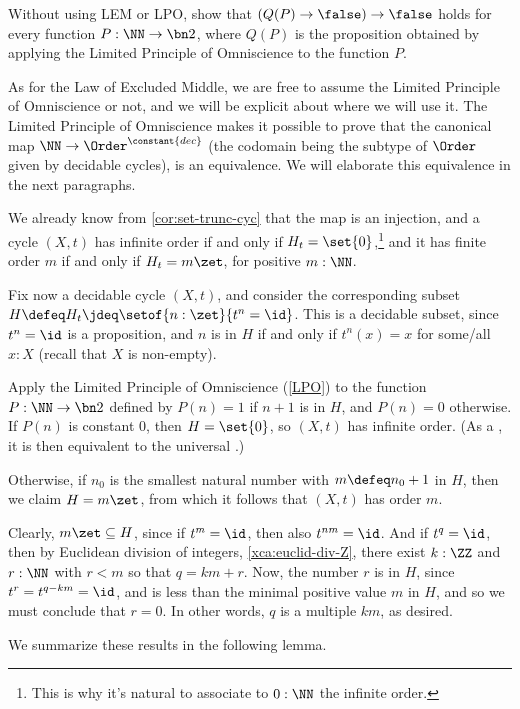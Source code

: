 \begin{xca}\label{xca:not-not-lpoP}
  Without using LEM or LPO, show that $(Q(P)\to\false)\to\false$ holds
  for every function $P:\NN\to\bn 2$, where $Q(P)$ is the proposition obtained
  by applying the Limited Principle of Omniscience to the function $P$.
\end{xca}

As for the Law of Excluded Middle, we are free to assume the Limited Principle of Omniscience
or not, and we will be explicit about where we will use it.
The Limited Principle of Omniscience makes it possible to prove that the canonical map
$\NN \to \Order^{\constant{dec}}$
(the codomain being the subtype of $\Order$ given by decidable cycles),
is an equivalence.
We will elaborate this equivalence in the next paragraphs.

We already know from \cref{cor:set-trunc-cyc} that the map is an injection,
and a cycle $(X,t)$ has infinite order
if and only if $H_t=\set{0}$,\footnote{%
  This is why it's natural to associate to $0:\NN$
  the infinite order.}
and it has finite order $m$
if and only if $H_t=m\zet$, for positive $m:\NN$.

Fix now a decidable cycle $(X,t)$,
and consider the corresponding subset $H \defeq H_t \jdeq \setof{n:\zet}{t^n=\id}$.
This is a decidable subset, since $t^n=\id$ is a proposition, and $n$ is in $H$
if and only if $t^n(x)=x$ for some/all $x:X$ (recall that $X$ is non-empty).

Apply the Limited Principle of Omniscience (\cref{LPO}) to the function $P:\NN\to\bn 2$ defined
by $P(n)=1$ if $n+1$ is in $H$, and $P(n)=0$ otherwise.
If $P(n)$ is constant $0$, then $H=\set{0}$,
so $(X,t)$ has infinite order.
(As a \covering, it is then equivalent to the universal \covering.)

Otherwise, if $n_0$ is the smallest natural number with $m\defeq n_0+1$ in $H$,
then we claim $H=m\zet$,
from which it follows that $(X,t)$ has order $m$.

Clearly, $m\zet \subseteq H$, since if $t^m=\id$, then also $t^{nm}=\id$.
And if $t^q=\id$, then by Euclidean division of integers, \cref{xca:euclid-div-Z},
there exist $k:\ZZ$ and $r:\NN$ with $r<m$ so that $q=km+r$.
Now, the number $r$ is in $H$, since $t^r=t^{q-km}=\id$,
and is less than the minimal positive value $m$ in $H$,
and so we must conclude that $r=0$.
In other words, $q$ is a multiple $km$, as desired.

We summarize these results in the following lemma.

